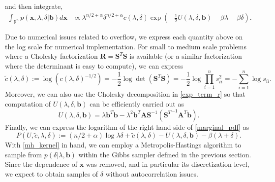 \documentclass{article}
\newcommand{\RR}{{\mathbb R}}
\newcommand{\vect}[1]{\boldsymbol{#1}}
\renewcommand{\tilde}{\widetilde}
\begin{document}
and then integrate,
\begin{align}
  \int_{\RR^n} p(\vect x,\lambda,\delta|\vect b)d\vect x 
  &\propto \lambda^{n/2+\alpha}\delta^{n/2+\alpha} c(\lambda,\delta) \exp\left(-\frac 12U(\lambda,\delta,\vect b) -\beta\lambda - \beta \delta \right). \label{marginal_pdf}
\end{align}

Due to numerical issues related to overflow, we express each quantity above on the log scale for numerical implementation.
For small to medium scale problems where a Cholesky factorization $\vect R = \vect S^T \vect S$ is available (or a similar factorization where the determinant is easy to compute), we can express 
\begin{equation}
  \tilde c(\lambda,\delta) := \log(c(\lambda,\delta)^{-1/2}) = -\frac 12 \log \det\left(\vect S^T \vect S\right)  = -\frac 12 \log \prod_{i=1}^n s_{ii}^2  = - \sum_{i=1}^n \log s_{ii}. \label{det_term}
\end{equation}
Moreover, we can also use the Cholesky decomposition in \eqref{exp_term_r} so that computation of $U(\lambda,\delta,\vect b)$ can be efficiently carried out as
\begin{equation}
  U(\lambda,\delta,\vect b)  
= \lambda\vect b^T\vect b - \lambda^2 \vect b^T \vect A\vect S^{-1} ({\vect S^T}^{-1} \vect A^T\vect b). \label{exp_term}
\end{equation}
Finally, we can express the logarithm of the right hand side of \eqref{marginal_pdf} as
\begin{equation}
  P(U,\tilde c,\lambda,\delta) := (n/2+\alpha) \log \lambda\delta +  \tilde c(\lambda,\delta) - U(\lambda,\delta,\vect b) - \beta(\lambda + \delta).\label{mh_kernel}
\end{equation}
With \eqref{mh_kernel} in hand, we can employ a Metropolis-Hastings algorithm to sample from $p(\delta|\lambda,\vect b)$ within the Gibbs sampler defined in the previous section. 
Since the dependence of $\vect x$ was removed, and in particular its discretization level, we expect to obtain samples of $\delta$ without autocorrelation issues.
\end{document}
